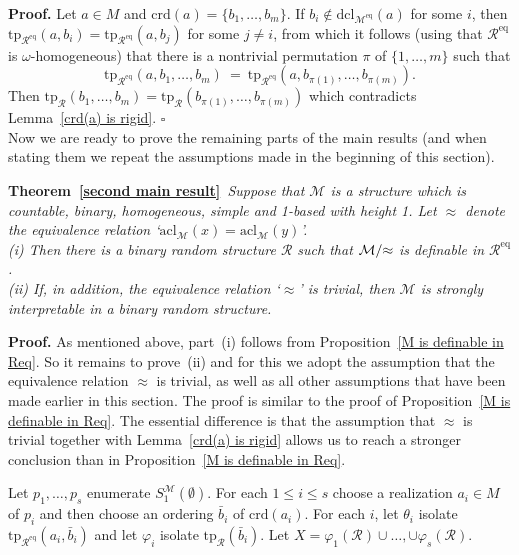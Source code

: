 \documentclass[11pt, twoside]{amsart}
\numberwithin{equation}{section}
\newcommand{\tp}{\mathrm{tp}}
\newcommand{\acl}{\mathrm{acl}}
\newcommand{\dcl}{\mathrm{dcl}}
\newcommand{\es}{\emptyset}
\newcommand{\nts}{\negthickspace}
\newcommand{\approxc}{\nts \approx}
\newcommand{\crd}{\mathrm{crd}}
\newcommand{\meq}{^{\mathrm{eq}}}
\newcommand{\mcM}{\mathcal{M}}
\newcommand{\mcR}{\mathcal{R}}
\begin{document}
\noindent
{\bf Proof.}
Let $a \in M$ and $\crd(a) = \{b_1, \ldots, b_m\}$.
If $b_i \notin \dcl_{\mcM\meq}(a)$ for some $i$, then 
$\tp_{\mcR\meq}(a, b_i) = \tp_{\mcR\meq}(a, b_j)$ for some $j \neq i$, from which it follows
(using that $\mcR\meq$ is $\omega$-homogeneous) that
there is a nontrivial permutation $\pi$ of $\{1, \ldots, m\}$ such that 
\[ \tp_{\mcR\meq}(a, b_1, \ldots, b_m) \ = \  \tp_{\mcR\meq}(a, b_{\pi(1)}, \ldots, b_{\pi(m)}). \]
Then $\tp_\mcR(b_1, \ldots, b_m) = \tp_\mcR(b_{\pi(1)}, \ldots, b_{\pi(m)})$ which contradicts
Lemma~\ref{crd(a) is rigid}.
\hfill $\square$
\\


\noindent
Now we are ready to prove the remaining parts of the main results (and when stating them we repeat the assumptions made
in the beginning of this section).


\bigskip

\noindent
{\bf Theorem~\ref{second main result}}{\em \ 
Suppose that $\mcM$ is a structure which is countable, binary, homogeneous, simple and 1-based with height 1.
Let $\approx$ denote the equivalence relation `$\acl_\mcM(x) = \acl_\mcM(y)$'.\\
(i) Then there is a binary random structure $\mcR$ such that $\mcM / \approxc$ is definable in $\mcR\meq$.\\
(ii) If, in addition, the equivalence relation `$\approx$' is trivial, 
then $\mcM$ is strongly interpretable in a binary random structure.
}

\medskip
\noindent
{\bf Proof.}
As mentioned above, part~(i) follows from Proposition~\ref{M is definable in Req}.
So it remains to prove~(ii) and for this we adopt the assumption that the equivalence relation $\approx$ is trivial, as well as
all other assumptions that have been made earlier in this section.
The proof is similar to the proof of Proposition~\ref{M is definable in Req}. 
The essential difference is that the assumption that $\approx$ is trivial together with Lemma~\ref{crd(a) is rigid} allows
us to reach a stronger conclusion than in Proposition~\ref{M is definable in Req}.

Let $p_1, \ldots, p_s$ enumerate $S^\mcM_1(\es)$.
For each $1 \leq i \leq s$ choose a realization $a_i \in M$ of $p_i$ and then choose an ordering
$\bar{b}_i$ of $\crd(a_i)$.
For each $i$, let $\theta_i$ isolate $\tp_{\mcR\meq}(a_i, \bar{b}_i)$ and let
$\varphi_i$ isolate $\tp_\mcR(\bar{b}_i)$.
Let $X = \varphi_1(\mcR) \cup \ldots, \cup \varphi_s(\mcR)$.
\end{document}
